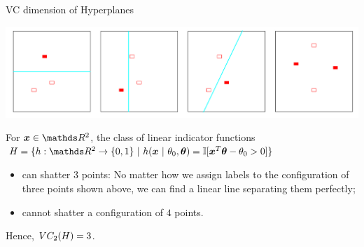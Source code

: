 \begin{vbframe}{VC dimension of Hyperplanes}

\center
\includegraphics{figure_man/vcdim3.png}

\flushleft

For $\xv\in\R^2$, the class of linear indicator functions $\Hspace = \{h: \R^2 \to \{0, 1\} \text{ | } h(\xv~|~\theta_0, \bm{\theta}) = \I[\xv^T\bm{\theta} - \theta_0 > 0]\}$

\begin{itemize}
  \item can shatter $3$ points: No matter how we assign labels to the configuration of three points shown above, we can find a linear line separating them perfectly;
  \item cannot shatter a configuration of $4$ points. 
\end{itemize}

Hence, $VC_2(H) = 3$.


\end{vbframe}
